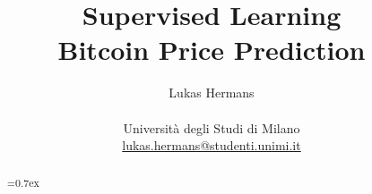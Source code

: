 \title{\large Supervised Learning \\ \LARGE
 Bitcoin Price Prediction}
\author{Lukas Hermans\\ \\
{Università degli Studi di Milano} \\
\href{mailto:lukas.hermans@studenti.unimi.it}
{lukas.hermans@studenti.unimi.it}}

\maketitle

\begin{abstract}
\font=0.7ex%
\lipsum[1]
\end{abstract}

